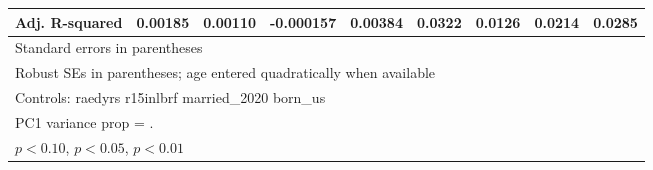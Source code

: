 \begin{table}[htbp]
\begin{tabular}{l*{8}{c}}
Adj. R-squared  &  0.00185         &  0.00110         &-0.000157         &  0.00384         &   0.0322         &   0.0126         &   0.0214         &   0.0285         \\
\bottomrule
\multicolumn{9}{l}{\footnotesize Standard errors in parentheses}\\
\multicolumn{9}{l}{\footnotesize Robust SEs in parentheses; age entered quadratically when available}\\
\multicolumn{9}{l}{\footnotesize Controls:  raedyrs r15inlbrf married\_2020 born\_us}\\
\multicolumn{9}{l}{\footnotesize PC1 variance prop =      .}\\
\multicolumn{9}{l}{\footnotesize \sym{*} \(p<0.10\), \sym{**} \(p<0.05\), \sym{***} \(p<0.01\)}\\
\end{tabular}
\end{table}
